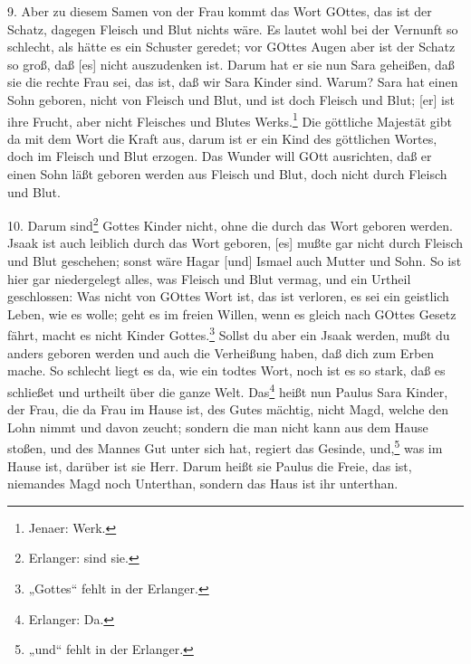 9. Aber zu diesem Samen von der Frau kommt das Wort GOttes, das ist der Schatz, dagegen Fleisch und Blut nichts wäre. Es lautet wohl bei der Vernunft so schlecht, als hätte es ein Schuster geredet; vor GOttes Augen aber ist der Schatz so groß, daß [es] nicht auszudenken ist. Darum hat er sie nun Sara geheißen, daß sie die rechte Frau sei, das ist, daß wir Sara Kinder sind. Warum? Sara hat einen Sohn geboren, nicht von Fleisch und Blut, und ist doch Fleisch und Blut; [er] ist ihre Frucht, aber nicht Fleisches und Blutes Werks.\footnote{Jenaer: Werk.} Die göttliche Majestät gibt da mit dem Wort die Kraft aus, darum ist er ein Kind des göttlichen Wortes, doch im Fleisch und Blut erzogen. Das Wunder will GOtt ausrichten, daß er einen Sohn läßt geboren werden aus Fleisch und Blut, doch nicht durch Fleisch und Blut.

10. Darum sind\footnote{Erlanger: sind sie.} Gottes Kinder nicht, ohne die durch das Wort geboren werden. Jsaak ist auch leiblich durch das Wort geboren, [es] mußte gar nicht durch Fleisch und Blut geschehen; sonst wäre Hagar [und] Ismael auch Mutter und Sohn. So ist hier gar niedergelegt alles, was Fleisch und Blut vermag, und ein Urtheil geschlossen: Was nicht von GOttes Wort ist, das ist verloren, es sei ein geistlich Leben, wie es wolle; geht es im freien Willen, wenn es gleich nach GOttes Gesetz fährt, macht es nicht Kinder Gottes.\footnote{„Gottes“ fehlt in der Erlanger.} Sollst du aber ein Jsaak werden, mußt du anders geboren werden und auch die Verheißung haben, daß dich zum Erben mache. So schlecht liegt es da, wie ein todtes Wort, noch ist es so stark, daß es schließet und urtheilt über die ganze Welt. Das\footnote{Erlanger: Da.} heißt nun Paulus Sara Kinder, der Frau, die da Frau im Hause ist, des Gutes mächtig, nicht Magd, welche den Lohn nimmt und davon zeucht; sondern die man nicht kann aus dem Hause stoßen, und des Mannes Gut unter sich hat, regiert das Gesinde, und,\footnote{„und“ fehlt in der Erlanger.} was im Hause ist, darüber ist sie Herr. Darum heißt sie Paulus die Freie, das ist, niemandes Magd noch Unterthan, sondern das Haus ist ihr unterthan.

